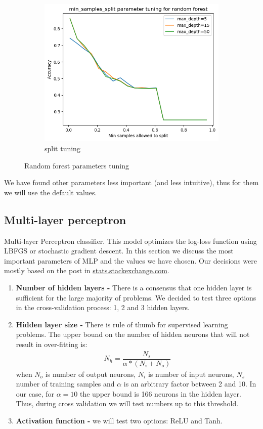 \documentclass[12pt]{article}
\begin{document}
\begin{figure}[h]
\begin{subfigure}{0.3\textwidth}
  \includegraphics[width=1\linewidth]{Cross_valid_plots/s_hyper_forest_fig}
  \caption{split tuning}
  \label{fig:sub2}
\end{subfigure}
\caption{Random forest parameters tuning}
\label{fig:test}
\end{figure}

We have found other parameters less important (and less intuitive), thus for them we will use the default values.

\subsection{Multi-layer perceptron}
Multi-layer Perceptron classifier. This model optimizes the log-loss function using LBFGS or stochastic gradient descent. In this section we discuss the most important parameters of MLP and the values we have chosen. Our decisions were mostly based on the post in \href{https://stats.stackexchange.com/questions/181/how-to-choose-the-number-of-hidden-layers-and-nodes-in-a-feedforward-neural-netw}{stats.stackexchange.com}.
\begin{enumerate}
	\item \textbf{Number of hidden layers -} There is a consensus that one hidden layer is sufficient for the large majority of problems. We decided to test three options in the cross-validation process: 1, 2 and 3 hidden layers.
	\item \textbf{Hidden layer size -} There is rule of thumb for supervised learning problems. The upper bound on the number of hidden neurons that will not result in over-fitting is:
\begin{gather*}
N_h = \dfrac{N_s}{\alpha * (N_i + N_o)}
\end{gather*}
when $N_o$ is number of output neurons, $N_i$ is number of input neurons, $N_s$ number of training samples and $\alpha$ is an arbitrary factor between 2 and 10. In our case, for $\alpha = 10$ the upper bound is 166 neurons in the hidden layer. Thus, during cross validation we will test numbers up to this threshold.
	\item \textbf{Activation function -} we will test two options: ReLU and Tanh.
\end{enumerate}
\end{document}
